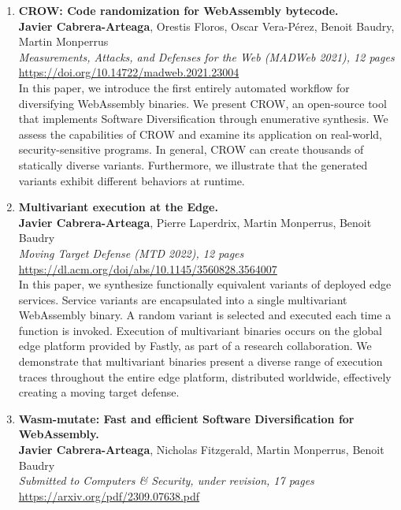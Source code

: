 \begin{enumerate}[label={\textbf{\Roman*}:}, ref={\Roman*}]
	\item \label{crowpaper} \textbf{CROW: Code randomization for WebAssembly bytecode.} \\ 
	\textbf{Javier Cabrera-Arteaga}, Orestis Floros, Oscar Vera-Pérez, Benoit Baudry, Martin Monperrus\\
	\textit{ Measurements, Attacks, and Defenses for the Web (MADWeb 2021), 12 pages} \\
	\url{https://doi.org/10.14722/madweb.2021.23004} \\
	
	 In this paper, we introduce the first entirely automated workflow for diversifying WebAssembly binaries. 
	We present CROW, an open-source tool that implements Software Diversification through enumerative synthesis. 
	We assess the capabilities of CROW and examine its application on real-world, security-sensitive programs.
	In general, CROW can create thousands of statically diverse variants. 
	Furthermore, we illustrate that the generated variants exhibit different behaviors at runtime.

	
	
	\item \label{mewepaper} \textbf{Multivariant execution at the Edge. } \\
	\textbf{Javier Cabrera-Arteaga}, Pierre Laperdrix, Martin Monperrus, Benoit Baudry\\
    \textit{Moving Target Defense (MTD 2022), 12 pages} \\
    \url{https://dl.acm.org/doi/abs/10.1145/3560828.3564007} \\

	In this paper, we synthesize functionally equivalent variants of deployed edge services. 
	Service variants are encapsulated into a single multivariant WebAssembly binary. 
	A random variant is selected and executed each time a function is invoked.
	Execution of multivariant binaries occurs on the global edge platform provided by Fastly, as part of a research collaboration. 
	We demonstrate that multivariant binaries present a diverse range of execution traces throughout the entire edge platform, distributed worldwide, effectively creating a moving target defense.

	
	\item \label{wasmmutatepaper}\textbf{Wasm-mutate: Fast and efficient Software Diversification for WebAssembly. }\\ 
	\textbf{Javier Cabrera-Arteaga}, Nicholas Fitzgerald, Martin Monperrus, Benoit Baudry\\
	\textit{Submitted to Computers \& Security, under revision, 17 pages} \\
	\url{https://arxiv.org/pdf/2309.07638.pdf}


\end{enumerate}
